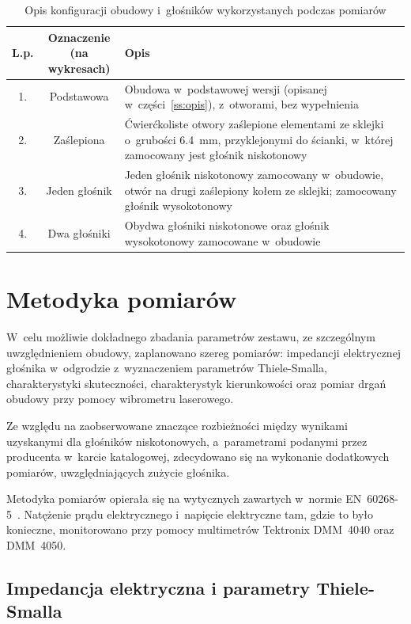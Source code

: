 \documentclass[12pt]{oska}
\begin{document}
		\begin{table}[!ht]
			\centering
			\caption{Opis konfiguracji obudowy i~głośników wykorzystanych podczas pomiarów}
			\label{t:obudowa}
			\begin{tabular}{|c|c|m{}|}
				\hline
				\textbf{L.p.} & \makecell{\textbf{Oznaczenie}\\\textbf{(na wykresach)}} & \centering\textbf{Opis} \tabularnewline\hline
				1. & Podstawowa & Obudowa w~podstawowej wersji (opisanej w~części~\ref{ss:opis}), z~otworami, bez wypełnienia \\\hline
				2. & Zaślepiona & Ćwierćkoliste otwory zaślepione elementami ze sklejki o~grubości \SI{6,4}{\milli\metre}, przyklejonymi do ścianki, w~której zamocowany jest głośnik niskotonowy\\\hline
				\hline
				3. & Jeden głośnik & Jeden głośnik niskotonowy zamocowany w~obudowie, otwór na drugi zaślepiony kołem ze sklejki; zamocowany głośnik wysokotonowy \\\hline
				4. & Dwa głośniki & Obydwa głośniki niskotonowe oraz głośnik wysokotonowy zamocowane w~obudowie\\\hline
			\end{tabular}
		\end{table}

\section{Metodyka pomiarów}

	W~celu możliwie dokładnego zbadania parametrów zestawu, ze szczególnym uwzględnieniem obudowy, zaplanowano szereg pomiarów: impedancji elektrycznej głośnika w~odgrodzie z~wyznaczeniem parametrów Thiele-Smalla, charakterystyki skuteczności, charakterystyk kierunkowości oraz pomiar drgań obudowy przy pomocy wibrometru laserowego.
	
	Ze względu na zaobserwowane znaczące rozbieżności między wynikami uzyskanymi dla głośników niskotonowych, a~parametrami podanymi przez producenta w~karcie katalogowej, zdecydowano się na wykonanie dodatkowych pomiarów, uwzględniających zużycie głośnika.
	
	Metodyka pomiarów opierała się na wytycznych zawartych w~normie EN~60268-5~\cite{norma}. Natężenie prądu elektrycznego i~napięcie elektryczne tam, gdzie to było konieczne, monitorowano przy pomocy multimetrów Tektronix DMM~4040 oraz DMM~4050.
	
		\subsection{Impedancja elektryczna i parametry Thiele-Smalla}
			
\end{document}
